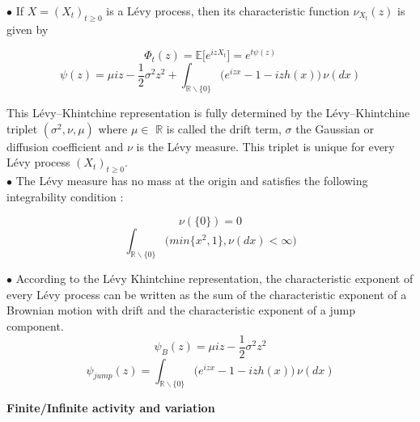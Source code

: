 \documentclass[12pt]{report}
\begin{document}
$\bullet$ If  $X = (X_t)_{t\geq 0}$  is a Lévy process, then its characteristic function  $\nu_{X_t}(z)$   is given by

\begin{equation}
\Phi_t(z)=\mathbb{E}\Big[e^{iz X_t} \Big] =e^ {t \psi (z)}
\end{equation}
\begin{equation}
\psi (z)= \mu iz - \frac{1}{2}\sigma^2  z^2 + 
\int_{\mathbb{R}\backslash\{0\}} \big( e^{izx}-1 -iz h(x)\big)\,\nu(dx) 
\end{equation}

This Lévy–Khintchine representation is fully determined by the Lévy–Khintchine triplet $(\sigma^2,\nu, \mu)$ where $\mu \in $ $\mathbb{R}$ is called the drift term, $\sigma$ the Gaussian or diffusion
coefficient and $\nu$ is the Lévy measure. This triplet is unique for every Lévy process $(X_t)_{t\geq 0}$.\\
$\bullet$ The Lévy measure has no mass at the origin and satisfies the following integrability condition :
\begin{multicols}{2}\noindent
\begin{equation}
 \nu( \{0 \}) = 0
\end{equation}
\begin{equation}
\int_{\mathbb{R}\backslash\{0\}} \big( min \{x^2,1\} ,\nu(dx) < \infty  \Big)
\end{equation}
\end{multicols}

$\bullet$ According to the Lévy Khintchine representation, the characteristic exponent of every Lévy process can be written as the sum of the characteristic exponent of a Brownian motion with drift and the characteristic exponent of a jump component.
$$\psi_B (z)= \mu iz - \frac{1}{2}\sigma^2  z^2 $$
$$\psi_{jump}(z)=\int_{\mathbb{R}\backslash\{0\}} \big( e^{izx}-1 -iz h(x)\big)\,\nu(dx)$$

\textbf{Finite/Infinite activity and variation }\\
\end{document}
